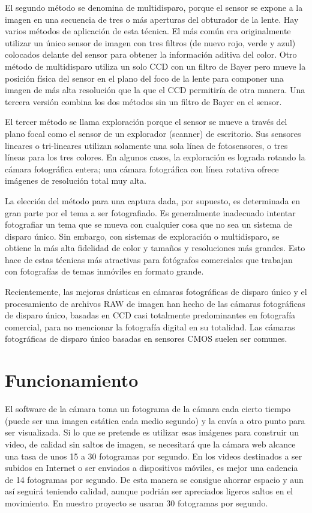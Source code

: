 \documentclass[12pt,a4paper]{report}
\begin{document}
El segundo método se denomina de multidisparo, porque el sensor se expone a la imagen en una secuencia de tres o más aperturas del obturador de la lente. Hay varios métodos de aplicación de esta técnica. El más común era originalmente utilizar un único sensor de imagen con tres filtros (de nuevo rojo, verde y azul) colocados delante del sensor para obtener la información aditiva del color. Otro método de multidisparo utiliza un solo CCD con un filtro de Bayer pero mueve la posición física del sensor en el plano del foco de la lente para componer una imagen de más alta resolución que la que el CCD permitiría de otra manera. Una tercera versión combina los dos métodos sin un filtro de Bayer en el sensor.

El tercer método se llama exploración porque el sensor se mueve a través del plano focal como el sensor de un explorador (scanner) de escritorio. Sus sensores lineares o tri-lineares utilizan solamente una sola línea de fotosensores, o tres líneas para los tres colores. En algunos casos, la exploración es lograda rotando la cámara fotográfica entera; una cámara fotográfica con línea rotativa ofrece imágenes de resolución total muy alta.

La elección del método para una captura dada, por supuesto, es determinada en gran parte por el tema a ser fotografiado. Es generalmente inadecuado intentar fotografiar un tema que se mueva con cualquier cosa que no sea un sistema de disparo único. Sin embargo, con sistemas de exploración o multidisparo, se obtiene la más alta fidelidad de color y tamaños y resoluciones más grandes. Esto hace de estas técnicas más atractivas para fotógrafos comerciales que trabajan con fotografías de temas inmóviles en formato grande.

Recientemente, las mejoras drásticas en cámaras fotográficas de disparo único y el procesamiento de archivos RAW de imagen han hecho de las cámaras fotográficas de disparo único, basadas en CCD casi totalmente predominantes en fotografía comercial, para no mencionar la fotografía digital en su totalidad. Las cámaras fotográficas de disparo único basadas en sensores CMOS suelen ser comunes.

\section{Funcionamiento}

El software de la cámara toma un fotograma de la cámara cada cierto tiempo (puede ser una imagen estática cada medio segundo) y la envía a otro punto para ser visualizada. Si lo que se pretende es utilizar esas imágenes para construir un video, de calidad sin saltos de imagen, se necesitará que la cámara web alcance una tasa de unos 15 a 30 fotogramas por segundo.
En los videos destinados a ser subidos en Internet o ser enviados a dispositivos móviles, es mejor una cadencia de 14 fotogramas por segundo. De esta manera se consigue ahorrar espacio y aun así seguirá teniendo calidad, aunque podrián ser apreciados ligeros saltos en el movimiento. En nuestro proyecto se usaran 30 fotogramas por segundo.
\end{document}
